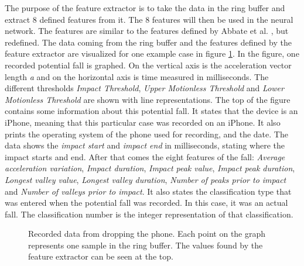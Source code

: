 \documentclass[12pt, a4paper, onecolumn]{article}
\begin{document}
	The purpose of the feature extractor is to take the data in the ring buffer and extract 8 defined features from it. The 8 features will then be used in the neural network. The features are similar to the features defined by Abbate et al. \cite{piza_uni}, but redefined. The data coming from the ring buffer and the features defined by the feature extractor are visualized for one example case in figure \ref{fig:fall-data-example}. In the figure, one recorded potential fall is graphed. On the vertical axis is the acceleration vector length \textit{a} and on the horizontal axis is time measured in milliseconds. The different thresholds \textit{Impact Threshold}, \textit{Upper Motionless Threshold} and \textit{Lower Motionless Threshold} are shown with line representations. The top of the figure contains some information about this potential fall. It states that the device is an iPhone, meaning that this particular case was recorded on an iPhone. It also prints the operating system of the phone used for recording, and the date. The data shows the \textit{impact start} and \textit{impact end} in milliseconds, stating where the impact starts and end. After that comes the eight features of the fall: \textit{Average acceleration variation}, \textit{Impact duration}, \textit{Impact peak value}, \textit{Impact peak duration}, \textit{Longest valley value}, \textit{Longest valley duration}, \textit{Number of peaks prior to impact} and \textit{Number of valleys prior to impact}. It also states the classification type that was entered when the potential fall was recorded. In this case, it was an actual fall. The classification number is the integer representation of that classification. 
	
	\begin{figure}[H]
		\centering
		\caption{Recorded data from dropping the phone. Each point on the graph represents one sample in the ring buffer. The values found by the feature extractor can be seen at the top.}%
		\label{fig:fall-data-example}%
	\end{figure}
	
\end{document}

